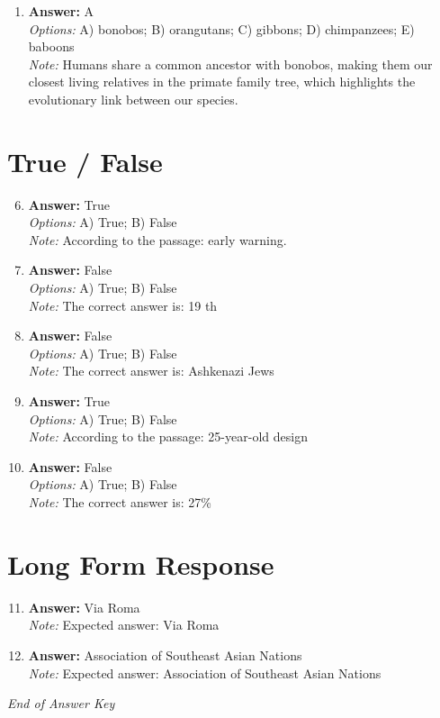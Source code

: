 \documentclass[12pt]{article}
\begin{document}
\begin{enumerate}[label=\arabic*.]
\\ \textit{Options:} A) stratigraphic analysis; B) resistivity survey; C) metal detectors; D) ground-penetrating radar; E) underwater archaeology
\\ \textit{Note:} Stratigraphic analysis is the correct answer because it allows archaeologists to examine the layers of soil and artifacts, providing insights into the chronology and extent of large-scale land modifications over time.
\item \textbf{Answer:} A
\\ \textit{Options:} A) bonobos; B) orangutans; C) gibbons; D) chimpanzees; E) baboons
\\ \textit{Note:} Humans share a common ancestor with bonobos, making them our closest living relatives in the primate family tree, which highlights the evolutionary link between our species.
\end{enumerate}

\section*{True / False}
\begin{enumerate}[label=\arabic*.]
\setcounter{enumi}{5}
\item \textbf{Answer:} True
\\ \textit{Options:} A) True; B) False
\\ \textit{Note:} According to the passage: early warning.
\item \textbf{Answer:} False
\\ \textit{Options:} A) True; B) False
\\ \textit{Note:} The correct answer is: 19 th
\item \textbf{Answer:} False
\\ \textit{Options:} A) True; B) False
\\ \textit{Note:} The correct answer is: Ashkenazi Jews
\item \textbf{Answer:} True
\\ \textit{Options:} A) True; B) False
\\ \textit{Note:} According to the passage: 25-year-old design
\item \textbf{Answer:} False
\\ \textit{Options:} A) True; B) False
\\ \textit{Note:} The correct answer is: 27\%
\end{enumerate}

\section*{Long Form Response}
\begin{enumerate}[label=\arabic*.]
\setcounter{enumi}{10}
\item \textbf{Answer:} Via Roma
\\ \textit{Note:} Expected answer: Via Roma
\item \textbf{Answer:} Association of Southeast Asian Nations
\\ \textit{Note:} Expected answer: Association of Southeast Asian Nations
\end{enumerate}

\vfill
\noindent\textit{End of Answer Key}
\end{document}
